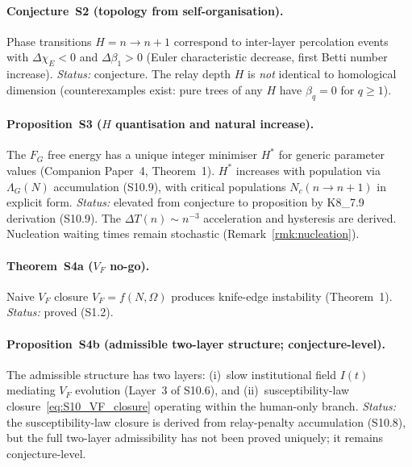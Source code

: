 \documentclass[11pt]{article}
\begin{document}
\paragraph{Conjecture~S2 (topology from self-organisation).}
Phase transitions $H=n\to n+1$ correspond to inter-layer percolation
events with $\Delta\chi_E<0$ and $\Delta\beta_1>0$ (Euler characteristic
decrease, first Betti number increase).
\emph{Status:} conjecture. The relay depth $H$ is \emph{not} identical
to homological dimension (counterexamples exist: pure trees of any $H$
have $\beta_q=0$ for $q\ge 1$).

\paragraph{Proposition~S3 ($H$ quantisation and natural increase).}
The $F_G$ free energy has a unique integer minimiser $H^*$ for generic
parameter values (Companion Paper~4, Theorem~1). $H^*$ increases with
population via $\Lambda_G(N)$ accumulation (S10.9), with critical
populations $N_c(n\!\to\!n{+}1)$ in explicit form.
\emph{Status:} elevated from conjecture to proposition by K8\_7.9
derivation (S10.9). The $\Delta T(n)\sim n^{-3}$ acceleration and
hysteresis are derived. Nucleation waiting times remain stochastic
(Remark~\ref{rmk:nucleation}).

\paragraph{Theorem~S4a ($V_F$ no-go).}
Naive $V_F$ closure $V_F=f(N,\Omega)$ produces knife-edge instability
(Theorem~1).
\emph{Status:} proved (S1.2).

\paragraph{Proposition~S4b (admissible two-layer structure; conjecture-level).}
The admissible structure has two layers: (i)~slow
institutional field $I(t)$ mediating $V_F$ evolution (Layer~3 of S10.6),
and (ii)~susceptibility-law closure~\eqref{eq:S10_VF_closure}
operating within the human-only branch.
\emph{Status:} the susceptibility-law closure
is derived from relay-penalty accumulation (S10.8), but the full two-layer admissibility has not been proved uniquely; it remains conjecture-level.

\end{document}

